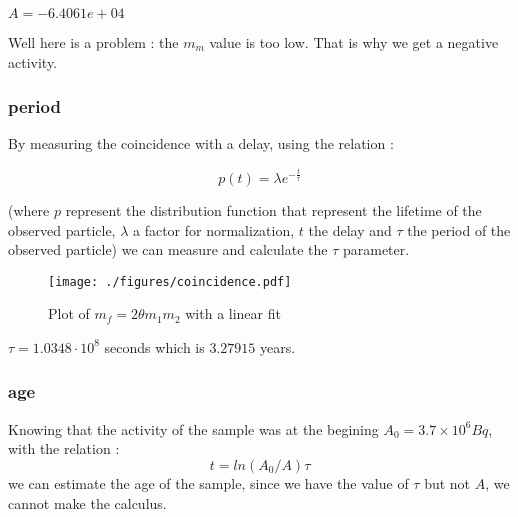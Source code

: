 \documentclass[a4paper,12pt,oneside]{article}
\def \be {\begin{equation}}
\def \ee {\end{equation}}
\begin{document}
	$A = -6.4061e+04 $

	Well here is a problem : the $m_m$ value is too low. That is why we get a negative activity.




	



\subsubsection{period}

	By measuring the coincidence with a delay, using the relation :

	\be
		p(t)= \lambda e^{-\frac{t}{\tau}}
	\ee

	(where $p$ represent the distribution function that represent the lifetime of the observed particle, $\lambda$ a factor for normalization, $t$ the delay and $\tau$ the period of the observed particle) we can measure and calculate the $\tau$ parameter. 


	\begin{figure}[h!]
		\begin{center}
		\texttt{[image: ./figures/coincidence.pdf]}
		\caption{Plot of $	m_f = 2\theta m_1 m_2$ with a linear fit} \label{fig:2theta}
		\end{center}
	\end{figure}


	$\tau = 1.0348 \cdot 10^8$ seconds which is $3.27915$ years.

\subsubsection{age}

	Knowing that the activity of the sample was at the begining $A_0 = 3.7\times10^6 Bq$, with the relation :
	\be
		t=ln(A_0/A)\tau
	\ee
	we can estimate the age of the sample, since we have the value of $\tau$ but not $A$, we cannot make the calculus. 
\end{document}
